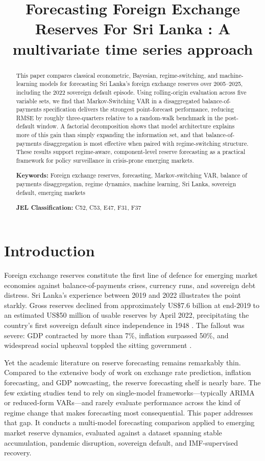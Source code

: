 \documentclass[12pt,a4paper]{article}
\title{Forecasting Foreign Exchange Reserves For Sri Lanka : A multivariate time series approach}
\author{}
\date{}
\begin{document}
\maketitle

\begin{abstract}
This paper compares classical econometric, Bayesian, regime-switching, and machine-learning models for forecasting Sri Lanka's foreign exchange reserves over 2005--2025, including the 2022 sovereign default episode. Using rolling-origin evaluation across five variable sets, we find that Markov-Switching VAR in a disaggregated balance-of-payments specification delivers the strongest point-forecast performance, reducing RMSE by roughly three-quarters relative to a random-walk benchmark in the post-default window. A factorial decomposition shows that model architecture explains more of this gain than simply expanding the information set, and that balance-of-payments disaggregation is most effective when paired with regime-switching structure. These results support regime-aware, component-level reserve forecasting as a practical framework for policy surveillance in crisis-prone emerging markets.

\noindent\textbf{Keywords:} Foreign exchange reserves, forecasting, Markov-switching VAR, balance of payments disaggregation, regime dynamics, machine learning, Sri Lanka, sovereign default, emerging markets

\noindent\textbf{JEL Classification:} C52, C53, E47, F31, F37
\end{abstract}

\section{Introduction}

Foreign exchange reserves constitute the first line of defence for emerging market economies against balance-of-payments crises, currency runs, and sovereign debt distress. Sri Lanka's experience between 2019 and 2022 illustrates the point starkly. Gross reserves declined from approximately US\$7.6 billion at end-2019 to an estimated US\$50 million of usable reserves by April 2022, precipitating the country's first sovereign default since independence in 1948 \citep{Athukorala2024,Wignaraja2024}. The fallout was severe: GDP contracted by more than 7\%, inflation surpassed 50\%, and widespread social upheaval toppled the sitting government \citep{Weerakoon2023}.

Yet the academic literature on reserve forecasting remains remarkably thin. Compared to the extensive body of work on exchange rate prediction, inflation forecasting, and GDP nowcasting, the reserve forecasting shelf is nearly bare. The few existing studies tend to rely on single-model frameworks---typically ARIMA or reduced-form VARs---and rarely evaluate performance across the kind of regime change that makes forecasting most consequential. This paper addresses that gap. It conducts a multi-model forecasting comparison applied to emerging market reserve dynamics, evaluated against a dataset spanning stable accumulation, pandemic disruption, sovereign default, and IMF-supervised recovery.
\end{document}
